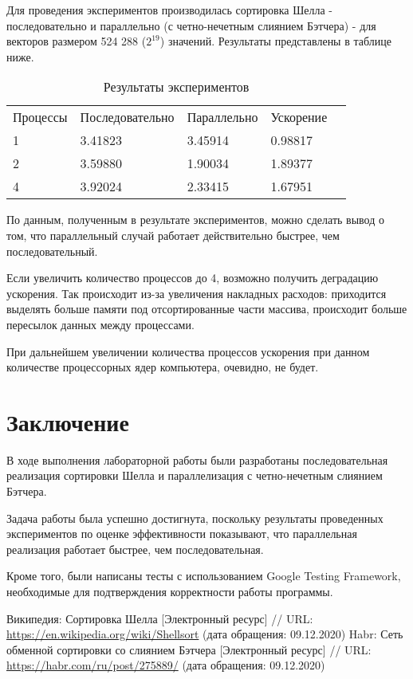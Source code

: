 \documentclass{report}
\begin{document}
\par Для проведения экспериментов производилась сортировка Шелла - последовательно и параллельно (с четно-нечетным слиянием Бэтчера) - для векторов размером 524 288 ($2^{19}$) значений. Результаты представлены в таблице ниже.

\begin{table}[!h]
\caption{Результаты экспериментов}
\centering
\begin{tabular}{lllll}
Процессы & Последовательно & Параллельно & Ускорение \\
1        & 3.41823         & 3.45914     & 0.98817   \\
2        & 3.59880         & 1.90034     & 1.89377   \\
4        & 3.92024         & 2.33415     & 1.67951
\end{tabular}
\end{table}

\par По данным, полученным в результате экспериментов, можно сделать вывод о том, что параллельный случай работает действительно быстрее, чем последовательный.
\par Если увеличить количество процессов до 4, возможно получить деградацию ускорения. Так происходит из-за увеличения накладных расходов: приходится выделять больше памяти под отсортированные части массива, происходит больше пересылок данных между процессами.
\par При дальнейшем увеличении количества процессов ускорения при данном количестве процессорных ядер компьютера, очевидно, не будет.
\newpage

\section*{Заключение}
В ходе выполнения лабораторной работы были разработаны последовательная реализация сортировки Шелла и параллелизация с четно-нечетным слиянием Бэтчера.
\par Задача работы была успешно достигнута, поскольку результаты проведенных экспериментов по оценке эффективности показывают, что параллельная реализация работает быстрее, чем последовательная.
\par Кроме того, были написаны тесты с использованием Google Testing Framework, необходимые для подтверждения корректности работы программы.
\newpage

\begin{thebibliography}{1}
 Википедия: Сортировка Шелла [Электронный ресурс] // URL: \url {https://en.wikipedia.org/wiki/Shellsort} (дата обращения: 09.12.2020)
 Habr: Сеть обменной сортировки со слиянием Бэтчера [Электронный ресурс] // URL: \url {https://habr.com/ru/post/275889/} (дата обращения: 09.12.2020)
\end{thebibliography}
\newpage
\end{document}
